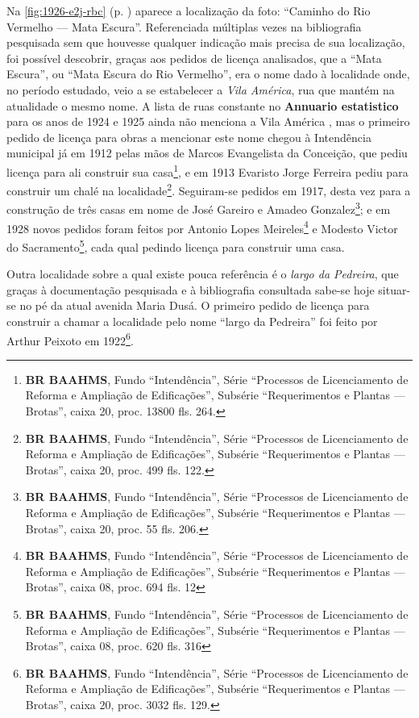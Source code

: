 



Na \autoref{fig:1926-e2j-rbc} (p. \pageref{fig:1926-e2j-rbc}) aparece a localização da foto: ``Caminho do Rio Vermelho --- Mata Escura''. Referenciada múltiplas vezes na bibliografia pesquisada sem que houvesse qualquer indicação mais precisa de sua localização, foi possível descobrir, graças aos pedidos de licença analisados, que a ``Mata Escura'', ou ``Mata Escura do Rio Vermelho'', era o nome dado à localidade onde, no período estudado, veio a se estabelecer a \textit{Vila América}, rua que mantém na atualidade o mesmo nome. A lista de ruas constante no \textbf{Annuario estatistico} para os anos de 1924 e 1925 ainda não menciona a Vila América \cite{bahia_annuario_1926}, mas o primeiro pedido de licença para obras a mencionar este nome chegou à Intendência municipal já em 1912 pelas mãos de Marcos Evangelista da Conceição, que pediu licença para ali construir sua casa\footnote{\textbf{BR BAAHMS}, Fundo ``Intendência'', Série ``Processos de Licenciamento de Reforma e Ampliação de Edificações'', Subsérie ``Requerimentos e Plantas --- Brotas'', caixa 20, proc. 13800 fls. 264.}, e em 1913 Evaristo Jorge Ferreira pediu para construir um chalé na localidade\footnote{\textbf{BR BAAHMS}, Fundo ``Intendência'', Série ``Processos de Licenciamento de Reforma e Ampliação de Edificações'', Subsérie ``Requerimentos e Plantas --- Brotas'', caixa 20, proc. 499 fls. 122.}. Seguiram-se pedidos em 1917, desta vez para a construção de três casas em nome de José Gareiro e Amadeo Gonzalez\footnote{\textbf{BR BAAHMS}, Fundo ``Intendência'', Série ``Processos de Licenciamento de Reforma e Ampliação de Edificações'', Subsérie ``Requerimentos e Plantas --- Brotas'', caixa 20, proc. 55 fls. 206.}; e em 1928 novos pedidos foram feitos por Antonio Lopes Meireles\footnote{\textbf{BR BAAHMS}, Fundo ``Intendência'', Série ``Processos de Licenciamento de Reforma e Ampliação de Edificações'', Subsérie ``Requerimentos e Plantas --- Brotas'', caixa 08, proc. 694 fls. 12} e Modesto Victor do Sacramento\footnote{\textbf{BR BAAHMS}, Fundo ``Intendência'', Série ``Processos de Licenciamento de Reforma e Ampliação de Edificações'', Subsérie ``Requerimentos e Plantas --- Brotas'', caixa 08, proc. 620 fls. 316}, cada qual pedindo licença para construir uma casa. 

Outra localidade sobre a qual existe pouca referência é o \textit{largo da Pedreira}, que graças à documentação pesquisada e à bibliografia consultada sabe-se hoje situar-se no pé da atual avenida Maria Dusá. O primeiro pedido de licença para construir a chamar a localidade pelo nome ``largo da Pedreira'' foi feito por Arthur Peixoto em 1922\footnote{\textbf{BR BAAHMS}, Fundo ``Intendência'', Série ``Processos de Licenciamento de Reforma e Ampliação de Edificações'', Subsérie ``Requerimentos e Plantas --- Brotas'', caixa 20, proc. 3032 fls. 129.}.

